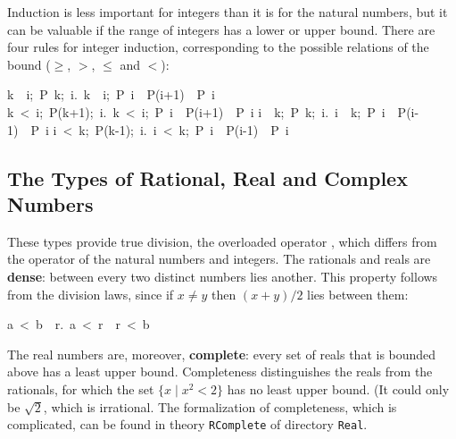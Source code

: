 Induction is less important for integers than it is for the natural numbers, but it can be valuable if the range of integers has a lower or upper bound.  There are four rules for integer induction, corresponding to the possible relations of the bound ($\geq$, $>$, $\leq$ and $<$):
\begin{isabelle}
\isasymlbrakk k\ \isasymle \ i;\ P\ k;\ \isasymAnd i.\ \isasymlbrakk k\ \isasymle \ i;\ P\ i\isasymrbrakk \ \isasymLongrightarrow \ P(i+1)\isasymrbrakk \ \isasymLongrightarrow \ P\ i%
\isanewline
\isasymlbrakk k\ <\ i;\ P(k+1);\ \isasymAnd i.\ \isasymlbrakk k\ <\ i;\ P\ i\isasymrbrakk \ \isasymLongrightarrow \ P(i+1)\isasymrbrakk \ \isasymLongrightarrow \ P\ i%
\isanewline
\isasymlbrakk i\ \isasymle \ k;\ P\ k;\ \isasymAnd i.\ \isasymlbrakk i\ \isasymle \ k;\ P\ i\isasymrbrakk \ \isasymLongrightarrow \ P(i-1)\isasymrbrakk \ \isasymLongrightarrow \ P\ i%
\isanewline
\isasymlbrakk i\ <\ k;\ P(k-1);\ \isasymAnd i.\ \isasymlbrakk i\ <\ k;\ P\ i\isasymrbrakk \ \isasymLongrightarrow \ P(i-1)\isasymrbrakk \ \isasymLongrightarrow \ P\ i%
\end{isabelle}


\subsection{The Types of Rational, Real and Complex Numbers}

%
%
%
These types provide true division, the overloaded operator \isa{/}, 
which differs from the operator  of the 
natural numbers and integers. The rationals and reals are 
\textbf{dense}: between every two distinct numbers lies another.
This property follows from the division laws, since if $x\not=y$ then $(x+y)/2$ lies between them:
\begin{isabelle}
a\ <\ b\ \isasymLongrightarrow \ \isasymexists r.\ a\ <\ r\ \isasymand \ r\ <\ b%
\end{isabelle}

The real numbers are, moreover, \textbf{complete}: every set of reals that
is bounded above has a least upper bound.  Completeness distinguishes the
reals from the rationals, for which the set $\{x\mid x^2<2\}$ has no least
upper bound.  (It could only be $\surd2$, which is irrational. The
formalization of completeness, which is complicated, 
can be found in theory \texttt{RComplete} of directory
\texttt{Real}.

